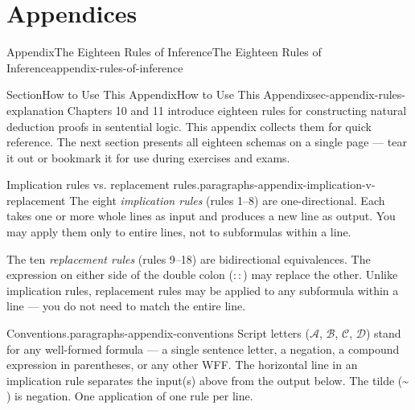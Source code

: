 \documentclass[oneside,10pt,]{book}
\begin{document}
\part*{Appendices}%
%
%
\typeout{************************************************}
\typeout{************************************************}
%
\begin{appendixptx}{Appendix}{The Eighteen Rules of Inference}{}{The Eighteen Rules of Inference}{}{}{appendix-rules-of-inference}
\renewcommand*{\appendixname}{Appendix}
%
%
\typeout{************************************************}
\typeout{************************************************}
%
\begin{sectionptx}{Section}{How to Use This Appendix}{}{How to Use This Appendix}{}{}{sec-appendix-rules-explanation}
Chapters 10 and 11 introduce eighteen rules for constructing natural deduction proofs in sentential logic. This appendix collects them for quick reference. The next section presents all eighteen schemas on a single page — tear it out or bookmark it for use during exercises and exams.%
\begin{paragraphs}{Implication rules vs. replacement rules.}{paragraphs-appendix-implication-v-replacement}%
The eight \emph{implication rules} (rules 1–8) are one-directional. Each takes one or more whole lines as input and produces a new line as output. You may apply them only to entire lines, not to subformulas within a line.%
\par
The ten \emph{replacement rules} (rules 9–18) are bidirectional equivalences. The expression on either side of the double colon (\(::\)) may replace the other. Unlike implication rules, replacement rules may be applied to any subformula within a line — you do not need to match the entire line.%
\end{paragraphs}%
\begin{paragraphs}{Conventions.}{paragraphs-appendix-conventions}%
Script letters (\(\mathcal{A}\), \(\mathcal{B}\), \(\mathcal{C}\), \(\mathcal{D}\)) stand for any well-formed formula — a single sentence letter, a negation, a compound expression in parentheses, or any other WFF. The horizontal line in an implication rule separates the input(s) above from the output below. The tilde (\({\text{\textasciitilde}}\)) is negation. One application of one rule per line.%
\end{paragraphs}%
\end{sectionptx}
\clearpage
{}

\end{appendixptx}
\end{document}
